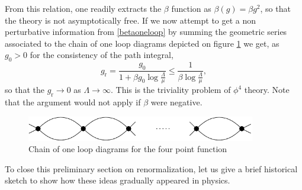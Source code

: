 \documentclass[12pt,here,feynmf]{article}
\begin{document}
From this relation, one readily extracts the $\beta$ function as $\beta(g)=\beta g^{2}$, so that the theory is not asymptotically free. If we now attempt to get a non perturbative information from \eqref{betaoneloop} by summing the geometric series associated to the chain of one loop diagrams depicted on figure \ref{chaindia} we get, as $g_{0}>0$ for the consistency of the path integral,
\begin{equation}
g_{\mathrm{r}}=\frac{g_{0}}{1+\beta g_{0}\log\frac{\Lambda}{\mu}}\leq\frac{1}{\beta\log\frac{\Lambda}{\mu}},
\end{equation}
so that the $g_{\mathrm{r}}\rightarrow 0$ as $\Lambda\rightarrow\infty$. This is the triviality problem of $\phi^{4}$ theory. Note that the argument would not apply if $\beta$ were negative.

\begin{figure}
\begin{center}
\includegraphics[width=10cm]{chain.pdf}
\caption{Chain of one loop diagrams for the four point function}
\label{chaindia}
\end{center}
\end{figure}



To close this preliminary section on renormalization, let us give a brief historical sketch to show how these ideas gradually appeared in physics.
\end{document}
